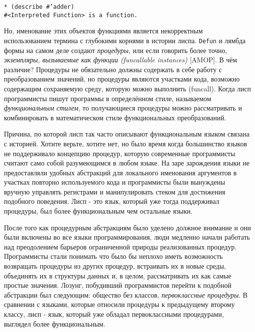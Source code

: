 \begin{verbatim} 
* (describe #’adder)
#<Interpreted Function> is a function. 
\end{verbatim}
 
Но, именование этих объектов функциями является некорректным использованием термина с глубокими корнями в истории лиспа. \verb"Defun" и лямбда формы на самом деле создают \emph{процедуры}, или если говорить более точно, \emph{экземпляры, вызываемые как функции (funcallable instances)} [AMOP]. В чём различие? Процедуры не обязательно должны содержать в себе работу с преобразованием значений, но процедуры являются участками кода, возможно содержащим сохраняемую среду, которую можно выполнить (funcall). Когда лисп программисты пишут программы в определённом стиле, называемом \emph{функциональным стилем}, то получающиеся процедуры можно рассматривать и комбинировать в математическом стиле функциональных преобразований. 
 
Причина, по которой лисп так часто описывают функциональным языком связана с историей. Хотите верьте, хотите нет, но было время когда большинство языков не поддерживало концепцию процедур, которую современные программисты считают само собой разумеющимся в любом языке. На заре зарождения языки не предоставляли удобных абстракций для локального именования аргументов в участках повторно используемого кода и программисты были вынуждены вручную управлять регистрами и манипулировать стеком для достижения подобного поведения. Лисп - это язык, который уже тогда поддерживал процедуры, был более функциональным чем остальные языки. 
 
После того как процедурным абстракциям было уделено должное внимание и они были включены во все языки программирования, люди медленно начали работать над преодолением барьеров ограниченной природы реализованных процедур. Программисты стали понимать что было бы неплохо иметь возможность возвращать процедуры из других процедур, встраивать их в новые среды, объединять их в структуры данных и, в целом, рассматривать их как самые простые значения. Лозунг, побудивший программистов перейти к подобной абстракции был следующим: общество без классов, \emph{первоклассные процедуры}. В сравнении с языками, которые относили процедуры к предыдущему второму классу, лисп - язык, который уже обладал первоклассными процедурами, выглядел более функциональным. 
 
